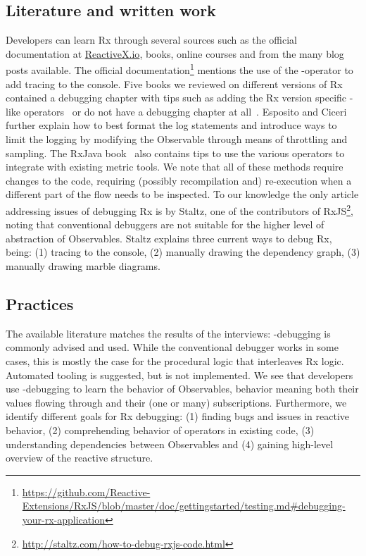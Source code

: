 \subsection{Literature and written work}
Developers can learn Rx through several sources such as the official documentation at \href{http://reactivex.io}{ReactiveX.io}, books, online courses and from the many blog posts available. The official documentation\footnote{
	\url{https://github.com/Reactive-Extensions/RxJS/blob/master/doc/gettingstarted/testing.md\#debugging-your-rx-application}
} mentions the use of the -operator to add tracing to the console. Five books we reviewed on different versions of Rx contained a debugging chapter with tips such as adding the Rx version specific -like operators~\cite{esposito2016reactive,rxjavabook2016} or do not have a debugging chapter at all~\cite{introtorx, rxjavabook2015, rxswiftbook2017}. Esposito and Ciceri~\cite{esposito2016reactive} further explain how to best format the log statements and introduce ways to limit the logging by modifying the Observable through means of throttling and sampling. The RxJava book~\cite{rxjavabook2016} also contains tips to use the various  operators to integrate with existing metric tools. We note that all of these methods require changes to the code, requiring (possibly recompilation and) re-execution when a different part of the flow needs to be inspected.
To our knowledge the only article addressing issues of debugging Rx is by Staltz, one of the contributors of RxJS\footnote{\url{http://staltz.com/how-to-debug-rxjs-code.html}}, noting that conventional debuggers are not suitable for the higher level of abstraction of Observables. Staltz explains three current ways to debug Rx, being: (1) tracing to the console, (2) manually drawing the dependency graph, (3) manually drawing marble diagrams.

\subsection{Practices}
The available literature matches the results of the interviews: -debugging is commonly advised and used. While the conventional debugger works in some cases, this is mostly the case for the procedural logic that interleaves Rx logic. Automated tooling is suggested, but is not implemented. We see that developers use -debugging to learn the behavior of Observables, behavior meaning both their values flowing through and their (one or many) subscriptions. Furthermore, we identify different goals for Rx debugging:
(1) finding bugs and issues in reactive behavior,
(2) comprehending behavior of operators in existing code,
(3) understanding dependencies between Observables and
(4) gaining high-level overview of the reactive structure.
